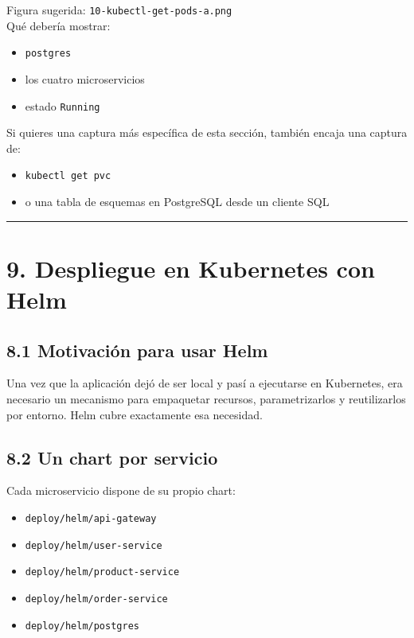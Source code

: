 \documentclass[
a4paper,
12pt]{report}
\providecommand{\tightlist}{%
  \setlength{\itemsep}{0pt}\setlength{\parskip}{0pt}}
\begin{document}
Figura sugerida: \texttt{10-kubectl-get-pods-a.png}\\
Qué debería mostrar:

\begin{itemize}
\tightlist
\item
  \texttt{postgres}
\item
  los cuatro microservicios
\item
  estado \texttt{Running}
\end{itemize}

Si quieres una captura más específica de esta sección, también encaja
una captura de:

\begin{itemize}
\tightlist
\item
  \texttt{kubectl\ get\ pvc}
\item
  o una tabla de esquemas en PostgreSQL desde un cliente SQL
\end{itemize}

\begin{center}\rule{0.5\linewidth}{0.5pt}\end{center}

\chapter{9. Despliegue en Kubernetes con
Helm}\label{despliegue-en-kubernetes-con-helm}

\section{8.1 Motivación para usar
Helm}\label{motivaciuxf3n-para-usar-helm}

Una vez que la aplicación dejó de ser local y pasí a ejecutarse en
Kubernetes, era necesario un mecanismo para empaquetar recursos,
parametrizarlos y reutilizarlos por entorno. Helm cubre exactamente esa
necesidad.

\section{8.2 Un chart por servicio}\label{un-chart-por-servicio}

Cada microservicio dispone de su propio chart:

\begin{itemize}
\tightlist
\item
  \texttt{deploy/helm/api-gateway}
\item
  \texttt{deploy/helm/user-service}
\item
  \texttt{deploy/helm/product-service}
\item
  \texttt{deploy/helm/order-service}
\item
  \texttt{deploy/helm/postgres}
\end{itemize}
\end{document}
